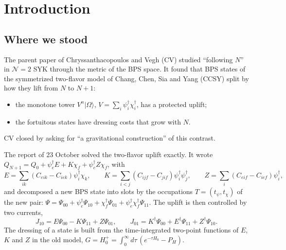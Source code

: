 \documentclass[11pt]{article}
\newcommand{\PH}{P_{\!H}}
\newcommand{\Om}{|\Omega\rangle}
\theoremstyle{plain}
\theoremstyle{remark}
\numberwithin{equation}{section}
\begin{document}
\tableofcontents

\section{Introduction}\label{sec:intro}

\subsection{Where we stood}

The parent paper of Chryssanthacopoulos and Vegh (CV) \cite{CV} studied ``following $N$'' in $\mathcal N=2$ SYK through
the metric of the BPS space. It found that BPS states of the symmetrized two-flavor model of Chang, Chen, Sia and Yang
(CCSY) \cite{CCSY} split by how they lift from $N$ to $N+1$:
\begin{itemize}\itemsep1pt
\item the monotone tower $V^n\Om$, $V=\sum_i\psi_i^\dagger\chi_i^\dagger$, has a protected uplift;
\item the fortuitous states have dressing costs that grow with $N$.
\end{itemize}
CV closed by asking for ``a gravitational construction'' of this contrast.

The report of 23 October \cite{prog1023} solved the two-flavor uplift exactly. It wrote $Q_{N+1}=Q_0+\psi_e^\dagger
E+K\chi_f+\psi_e^\dagger Z\chi_f$, with
\begin{equation}
E=\textstyle\sum_{ik}(C_{eik}-C_{iek})\psi_i^\dagger\chi_k,\qquad
K=\textstyle\sum_{i<j}(C_{ijf}-C_{jif})\psi_i^\dagger\psi_j^\dagger,\qquad
Z=\textstyle\sum_i(C_{eif}-C_{ief})\psi_i^\dagger ,
\end{equation}
and decomposed a new BPS state into slots by the occupations $T=(t_\psi,t_\chi)$ of the new pair:
$\Psi=\Psi_{00}+\psi_e^\dagger\Psi_{10}+\chi_f^\dagger\Psi_{01}+\psi_e^\dagger\chi_f^\dagger\Psi_{11}$.
The uplift is then controlled by two currents,
\begin{equation}\label{eq:currents}
J_{10}=E\Psi_{00}-K\Psi_{11}+Z\Psi_{01},\qquad J_{01}=K^\dagger\Psi_{00}+E^\dagger\Psi_{11}+Z^\dagger\Psi_{10}.
\end{equation}
The dressing of a state is built from the time-integrated two-point functions of $E$, $K$ and $Z$ in the old model,
$G=H_0^+=\int_0^\infty d\tau\,(e^{-\tau H_0}-\PH)$.
\end{document}
